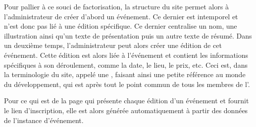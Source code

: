 Pour pallier à ce souci de factorisation, la structure du site permet alors à l'administrateur de créer d'abord un événement. Ce dernier est intemporel et n'est donc pas lié à une édition spécifique. Ce dernier centralise un nom, une illustration ainsi qu'un texte de présentation puis un autre texte de résumé. Dans un deuxième temps, l'administrateur peut alors créer une édition de cet événement. Cette édition est alors liée à l'événement et contient les informations spécifiques à son déroulement, comme la date, le lieu, le prix, etc. Ceci est, dans la terminologie du site, appelé une , faisant ainsi une petite référence au monde du développement, qui est après tout le point commun de tous les membres de l'\ofni.

Pour ce qui est de la page qui présente chaque édition d'un événement et fournit le lien d'inscription, elle est alors générée automatiquement à partir des données de l'instance d'événement.

